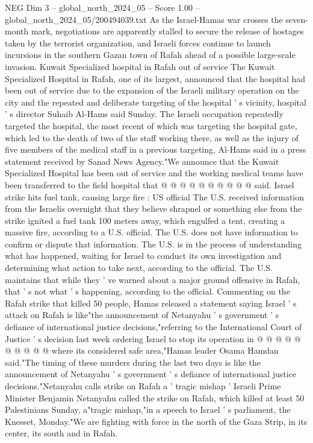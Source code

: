 \begin{textsample}{NEG Dim 3 – global\_north\_2024\_05 – Score 1.00 – global\_north\_2024\_05/200494039.txt}  \label{ex:f3_neg_444}
As the Israel-Hamas war crosses the seven-month mark, negotiations are apparently stalled to secure the release of hostages taken by the terrorist organization, and Israeli forces continue to launch incursions in the southern Gazan town of Rafah ahead of a possible large-scale invasion.
Kuwait Specialized hospital in Rafah out of service The Kuwait Specialized Hospital in Rafah, one of its largest, announced that the hospital had been out of service due to the expansion of the Israeli military operation on the city and the repeated and deliberate targeting of the hospital ' s vicinity, hospital ' s director Suhaib Al-Hams said Sunday.
The Israeli occupation repeatedly targeted the hospital, the most recent of which was targeting the hospital gate, which led to the death of two of the staff working there, as well as the injury of five members of the medical staff in a previous targeting, Al-Hams said in a press statement received by Sanad News Agency."We announce that the Kuwait Specialized Hospital has been out of service and the working medical teams have been transferred to the field hospital that @ @ @ @ @ @ @ @ @ @ said.
Israel strike hits fuel tank, causing large fire : US official The U.S. received information from the Israelis overnight that they believe shrapnel or something else from the strike ignited a fuel tank 100 meters away, which engulfed a tent, creating a massive fire, according to a U.S. official.
The U.S. does not have information to confirm or dispute that information.
The U.S. is in the process of understanding what has happened, waiting for Israel to conduct its own investigation and determining what action to take next, according to the official.
The U.S. maintains that while they ' ve warned about a major ground offensive in Rafah, that ' s not what ' s happening, according to the official.
Commenting on the Rafah strike that killed 50 people, Hamas released a statement saying Israel ' s attack on Rafah is like"the announcement of Netanyahu ' s government ' s defiance of international justice decisions,"referring to the International Court of Justice ' s decision last week ordering Israel to stop its operation in @ @ @ @ @ @ @ @ @ @ where its considered safe area,"Hamas leader Osama Hamdan said."The timing of these murders during the last two days is like the announcement of Netanyahu ' s government ' s defiance of international justice decisions."Netanyahu calls strike on Rafah a ' tragic mishap ' Israeli Prime Minister Benjamin Netanyahu called the strike on Rafah, which killed at least 50 Palestinians Sunday, a"tragic mishap,"in a speech to Israel ' s parliament, the Knesset, Monday."We are fighting with force in the north of the Gaza Strip, in its center, its south and in Rafah.

\end{textsample}
